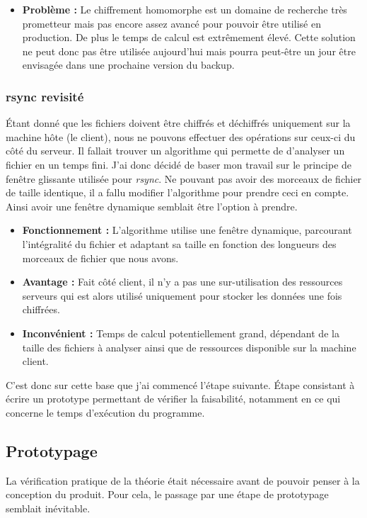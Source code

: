 \documentclass[a4paper,10pt, twoside]{report}
\begin{document}
\begin{spacing}{1.2}
\begin{itemize}
 \item \textbf{Probl\`eme :} Le chiffrement homomorphe est un domaine de
 recherche tr\`es prometteur mais pas encore assez avanc\'e pour pouvoir
 \^etre utilis\'e en production. De plus le temps de calcul est extr\^emement
 \'elev\'e. Cette solution ne peut donc pas \^etre utilis\'ee aujourd'hui mais
 pourra peut-\^etre un jour \^etre envisag\'ee dans une prochaine version du
backup.
\end{itemize}

\subsubsection{rsync revisit\'e}
\'Etant donn\'e que les fichiers doivent \^etre chiffr\'es et d\'echiffr\'es
uniquement sur la machine h\^ote (le client), nous ne pouvons effectuer des
op\'erations sur ceux-ci du c\^ot\'e du serveur. Il fallait trouver un
algorithme qui permette de d'analyser un fichier en un temps fini. J'ai donc
d\'ecid\'e de baser mon travail sur le principe de fen\^etre glissante
utilis\'ee pour \textit{rsync}. Ne pouvant pas avoir des morceaux de fichier de
taille identique, il a fallu modifier l'algorithme pour prendre ceci en compte.
Ainsi avoir une fen\^etre dynamique semblait \^etre l'option \`a prendre.

\begin{itemize}
 \item \textbf{Fonctionnement :} L'algorithme utilise une fen\^etre dynamique,
 parcourant l'int\'egralit\'e du fichier et adaptant sa taille en fonction
 des longueurs des morceaux de fichier que nous avons.
 
 \item \textbf{Avantage :} Fait c\^ot\'e client, il n'y a pas une
 sur-utilisation des ressources serveurs qui est alors utilis\'e uniquement
 pour stocker les donn\'ees une fois chiffr\'ees.
 
 \item \textbf{Inconv\'enient :} Temps de calcul potentiellement grand,
 d\'ependant de la taille des fichiers \`a analyser ainsi que de ressources
 disponible sur la machine client.
\end{itemize}

C'est donc sur cette base que j'ai commenc\'e l'\'etape suivante. \'Etape 
consistant \`a \'ecrire un prototype permettant de v\'erifier la faisabilit\'e,
notamment en ce qui concerne le temps d'ex\'ecution du programme.

\subsection{Prototypage}
La v\'erification pratique de la th\'eorie \'etait n\'ecessaire avant de
pouvoir penser \`a la conception du produit. Pour cela, le passage par une
\'etape de prototypage semblait in\'evitable.


\end{spacing}
\end{document}
